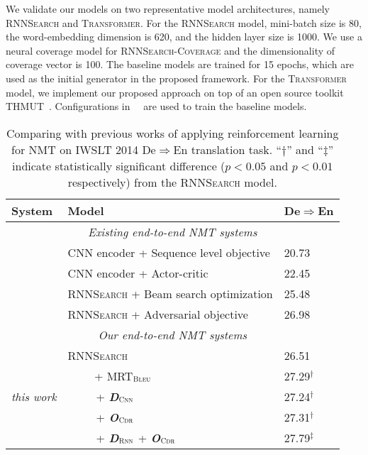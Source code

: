 \documentclass[letterpaper]{article} \usepackage{aaai19}  \usepackage{times}  \usepackage{helvet}  \usepackage{courier}  \usepackage{url}  \usepackage{graphicx}  \frenchspacing  \setlength{\pdfpagewidth}{8.5in}  \setlength{\pdfpageheight}{11in}  \usepackage{amsmath}
\begin{document}
We validate our models on two representative model architectures, namely \textsc{RNNSearch} and \textsc{Transformer}.
For the \textsc{RNNSearch} model, mini-batch size is 80, the word-embedding dimension is 620, and the hidden layer size is 1000. We use a neural coverage model for \textsc{RNNSearch-Coverage} and the dimensionality of coverage vector is 100. The baseline models are trained for 15 epochs, which are used as the initial generator in the proposed framework.
For the \textsc{Transformer} model, we implement our proposed approach on top of an open source toolkit THMUT~\cite{zhang2017thumt}. Configurations in~\citeauthor{vaswani2017attention}~ are used to train the baseline models.



\begin{table*}[t]
\centering
\begin{tabular}{l|l|l}
{\bf System} &  {\bf Model}  &   {\bf De$\Rightarrow$En}     \\
\hline
\hline
\multicolumn{3}{c}{\em Existing end-to-end NMT systems} \\
\hline
\cite{Ranzato:2016:ICLR}    &   CNN encoder + Sequence level objective  &   20.73 \\
\cite{bahdanau2016actor}    &   CNN encoder + Actor-critic &   22.45    \\
\cite{Wiseman:2016:EMNLP}   &   \textsc{RNNSearch} + Beam search optimization   &   25.48   \\
\cite{wu2017adversarial} & \textsc{RNNSearch} + Adversarial objective &   26.98  \\
\hline
\hline
\multicolumn{3}{c}{\em Our end-to-end NMT systems} \\
\hline
\multirow{5}{*}{\em this work}  &   \textsc{RNNSearch}    &   26.51 \\
                                &    ~~~~ + MRT$_{\textsc{Bleu}}$ & 27.29$^{\dag}$  \\
                                &   ~~~~~+ {\bf \em D}$_{\textsc{Cnn}}$ &  27.24$^{\dag}$  \\
                                &   ~~~~~+ {\bf \em O}$_{\textsc{Cdr}}$ & 27.31$^{\dag}$   \\
                                &   ~~~~~+ {\bf \em D}$_{\textsc{Rnn}}$ + {\bf \em O}$_{\textsc{Cdr}}$ &   27.79$^{\ddag}$  \\
\end{tabular}
\caption{Comparing with previous works of applying reinforcement learning for NMT on IWSLT 2014 De$\Rightarrow$En translation task. ``$\dag$'' and ``$\ddag$'' indicate statistically significant difference ($p < 0.05$ and $p < 0.01$ respectively)  from the  \textsc{RNNSearch} model. }
\label{tab:res-iwslt-en-de} 
\end{table*}
\end{document}
